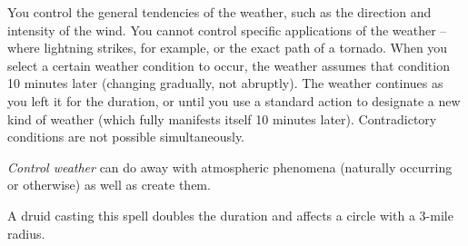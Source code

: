 You control the general tendencies of the weather, such as the direction and intensity 
of the wind. You cannot control specific applications of the weather -- where lightning 
strikes, for example, or the exact path of a tornado. When you select a certain 
weather condition to occur, the weather assumes that condition 10 minutes later 
(changing gradually, not abruptly). The weather continues as you left it for the 
duration, or until you use a standard action to designate a new kind of weather 
(which fully manifests itself 10 minutes later). Contradictory conditions are not 
possible simultaneously.

\textit{Control weather} can do away with atmospheric phenomena (naturally occurring 
or otherwise) as well as create them.

A druid casting this spell doubles the duration and affects a circle with a 3-mile 
radius.

